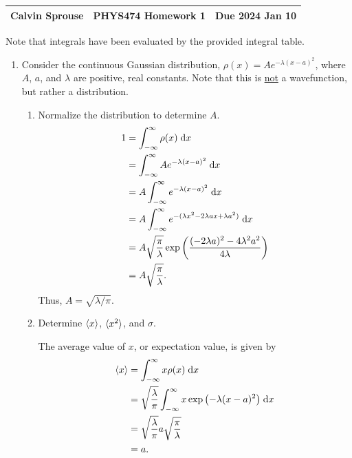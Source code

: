\documentclass[a4paper, 12pt]{config/homework}
\begin{document}
\noindent
\begin{tabularx}{\textwidth}{>{\centering\arraybackslash}X>{\centering\arraybackslash}X>{\centering\arraybackslash}X}
Calvin Sprouse & PHYS474 Homework 1 & Due 2024 Jan 10\\
\midrule
\end{tabularx}

Note that integrals have been evaluated by the provided integral table.
\begin{enumerate}
\item Consider the continuous Gaussian distribution, \(\rho(x) = Ae^{-\lambda (x-a)^2}\), where \(A\), \(a\), and \(\lambda \) are positive, real constants. Note that this is \underline{not} a wavefunction, but rather a distribution.
\begin{enumerate}[label=(\alph*)]
\item Normalize the distribution to determine \(A\).
\begin{align*}
1 &= \bint{-\infty}{\infty}{\rho(x)}{x}
\\&= \bint{-\infty}{\infty}{Ae^{-\lambda (x-a)^2}}{x}
\\&= A \bint{-\infty}{\infty}{e^{-\lambda (x-a)^2}}{x}
\\&= A \bint{-\infty}{\infty}{e^{-(\lambda x^2 -2\lambda ax + \lambda a^2)}}{x}
\\&= A \sqrt{\frac{\pi}{\lambda}} \exp\left({\frac{(-2\lambda a)^2 - 4\lambda^2 a^2}{4\lambda}}\right)
\\&= A \sqrt{\frac{\pi}{\lambda}}.
\end{align*}
Thus, \(A = \sqrt{\lambda / \pi}\).

\item Determine \(\braket{x}\), \(\braket{x^2}\), and \(\sigma \).

The average value of \(x\), or expectation value, is given by
\begin{align*}
\braket{x} &= \bint{-\infty}{\infty}{x \rho(x)}{x}
\\&= \sqrt{\frac{\lambda}{\pi}} \bint{-\infty}{\infty}{x \exp{\left(-\lambda(x-a)^2\right)}}{x}
\\&= \sqrt{\frac{\lambda}{\pi}} a \sqrt{\frac{\pi}{\lambda}}
\\&= a.
\end{align*}


\end{enumerate}
\end{enumerate}
\end{document}
